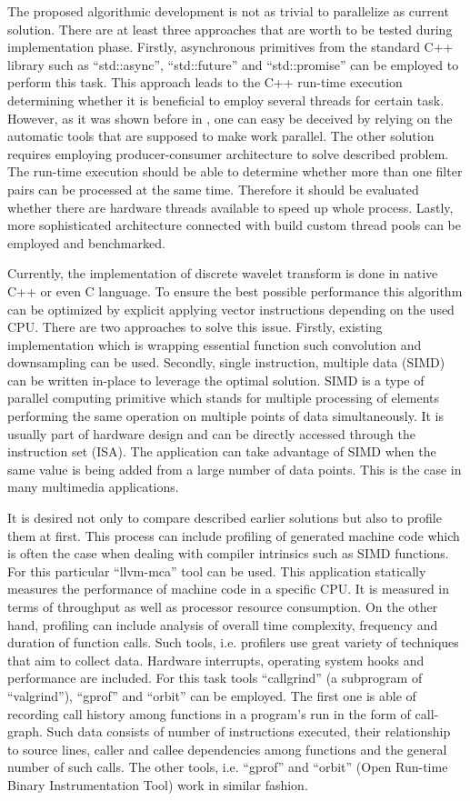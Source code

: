 The proposed algorithmic development is not as trivial to parallelize as current solution. There are at least
three approaches that are worth to be tested during implementation phase. Firstly, asynchronous primitives from
the standard C++ library such as ``std::async'', ``std::future'' and ``std::promise'' can be employed to perform
this task. This approach leads to the C++ run-time execution determining whether it is beneficial to employ several
threads for certain task. However, as it was shown before in , one can easy be deceived by relying
on the automatic tools that are supposed to make work parallel. The other solution requires employing producer-consumer
architecture to solve described problem. The run-time execution should be able to determine whether more than one
filter pairs can be processed at the same time. Therefore it should be evaluated whether there are hardware threads
available to speed up whole process. Lastly, more sophisticated architecture connected with build custom thread
pools can be employed and benchmarked.

Currently, the implementation of discrete wavelet transform is done in native C++ or even C language. To ensure
the best possible performance this algorithm can be optimized by explicit applying vector instructions depending
on the used CPU. There are two approaches to solve this issue. Firstly, existing implementation which is wrapping
essential function such convolution and downsampling can be used. Secondly, single instruction, multiple data (SIMD)
can be written in-place to leverage the optimal solution. SIMD is a type of parallel computing primitive which stands
for multiple processing of elements performing the same operation on multiple points of data simultaneously. It is
usually part of hardware design and can be directly accessed through the instruction set (ISA). The application can
take advantage of SIMD when the same value is being added from a large number of data points. This is the case
in many multimedia applications.

It is desired not only to compare described earlier solutions but also to profile them at first. This process can
include profiling of generated machine code which is often the case when dealing with compiler intrinsics such as
SIMD functions. For this particular ``llvm-mca'' tool can be used. This application statically measures the performance
of machine code in a specific CPU. It is measured in terms of throughput as well as processor resource consumption.
On the other hand, profiling can include analysis of overall time complexity, frequency and duration of function calls.
Such tools, i.e. profilers use great variety of techniques that aim to collect data. Hardware interrupts, operating
system hooks and performance are included. For this task tools ``callgrind'' (a subprogram of ``valgrind''), ``gprof''
and ``orbit'' can be employed. The first one is able of recording call history among functions in a program's run in
the form of call-graph. Such data consists of number of instructions executed, their relationship to source lines,
caller and callee dependencies among functions and the general number of such calls. The other tools, i.e. ``gprof''
and ``orbit'' (Open Run-time Binary Instrumentation Tool) work in similar fashion.
